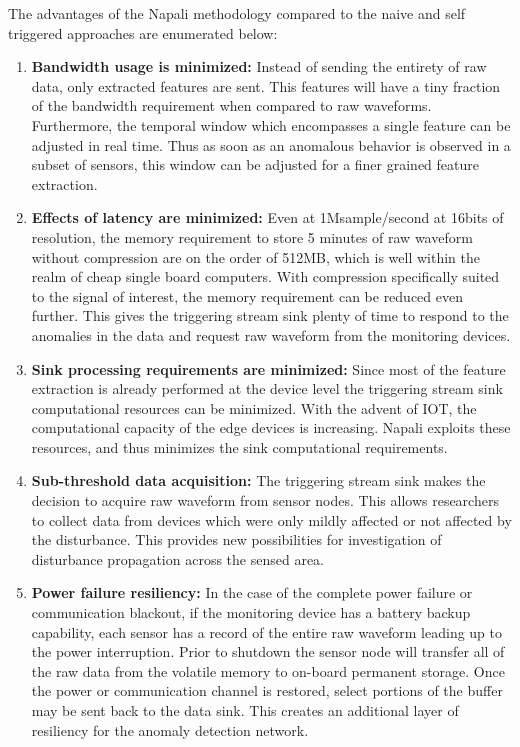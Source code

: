 The advantages of the Napali methodology compared to the naive and self triggered approaches are enumerated below:
\begin{enumerate}
    \item \textbf{Bandwidth usage is minimized:} Instead of sending the entirety of raw data, only extracted features are sent.
    This features will have a tiny fraction of the bandwidth requirement when compared to raw waveforms.
    Furthermore, the temporal window which encompasses a single feature can be adjusted in real time.
    Thus as soon as an anomalous behavior is observed in a subset of sensors, this window can be adjusted for a finer grained feature extraction.

    \item \textbf{Effects of latency are minimized:} Even at 1Msample/second at 16bits of resolution, the memory requirement to store 5 minutes of raw waveform without compression are on the order of 512MB, which is well within the realm of cheap single board computers.
    With compression specifically suited to the signal of interest, the memory requirement can be reduced even further.
    This gives the triggering stream sink plenty of time to respond to the anomalies in the data and request raw waveform from the monitoring devices.

    \item \textbf{Sink processing requirements are minimized:} Since most of the feature extraction is already performed at the device level the triggering stream sink computational resources can be minimized.
    With the advent of IOT, the computational capacity of the edge devices is increasing.
    Napali exploits these resources, and thus minimizes the sink computational requirements.

    \item \textbf{Sub-threshold data acquisition:} The triggering stream sink makes the decision to acquire raw waveform from sensor nodes.
    This allows researchers to collect data from devices which were only mildly affected or not affected by the disturbance.
    This provides new possibilities for investigation of disturbance propagation across the sensed area.

    \item \textbf{Power failure resiliency:} In the case of the complete power failure or communication blackout, if the monitoring device has a battery backup capability, each sensor has a record of the entire raw waveform leading up to the power interruption.
    Prior to shutdown the sensor node will transfer all of the raw data from the volatile memory to on-board permanent storage.
    Once the power or communication channel is restored, select portions of the buffer may be sent back to the data sink.
    This creates an additional layer of resiliency for the anomaly detection network.


\end{enumerate}
